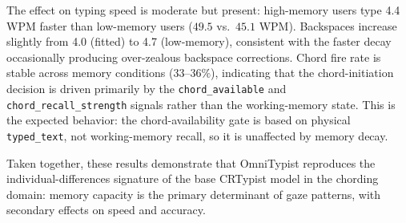 \documentclass[sigconf,review,anonymous]{acmart}
\begin{document}
The effect on typing speed is moderate but present: high-memory users type 4.4 WPM faster than low-memory users ($49.5$ vs.\ $45.1$ WPM). Backspaces increase slightly from 4.0 (fitted) to 4.7 (low-memory), consistent with the faster decay occasionally producing over-zealous backspace corrections. Chord fire rate is stable across memory conditions ($33$–$36\%$), indicating that the chord-initiation decision is driven primarily by the \texttt{chord\_available} and \texttt{chord\_recall\_strength} signals rather than the working-memory state. This is the expected behavior: the chord-availability gate is based on physical \texttt{typed\_text}, not working-memory recall, so it is unaffected by memory decay.

Taken together, these results demonstrate that OmniTypist reproduces the individual-differences signature of the base CRTypist model in the chording domain: memory capacity is the primary determinant of gaze patterns, with secondary effects on speed and accuracy.

 




\begin{acks}

\end{acks}




\end{document}
